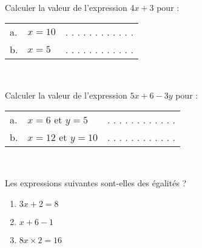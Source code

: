 \documentclass[a4paper,12pt,landscape,twocolumn]{article}
\begin{document}
{	\begin{exercice}\

		Calculer la valeur de l'expression $4x + 3$ pour : \vspace{0.3em}

		\begin{tabular}{lll}
			a. & $x = 10$ & . . . . . . . . . . . . \\ %
			b. & $x = 5$  & . . . . . . . . . . . . \\ %
		\end{tabular}
	\end{exercice}

	\begin{exercice}\

		Calculer la valeur de l'expression $5x + 6 - 3y$ pour : \vspace{0.3em}

		\begin{tabular}{lll}
			a. & $x = 6$ et $y = 5$   & . . . . . . . . . . . . \\ %
			b. & $x = 12$ et $y = 10$ & . . . . . . . . . . . . \\ %
		\end{tabular}
	\end{exercice}

	\begin{exercice}\

		Les expressions suivantes sont-elles des égalités ?
		\begin{enumerate}[label=\alph*.]
			\item $3x + 2 = 8$
			\item $x + 6 - 1$
			\item $8x × 2 = 16$
		\end{enumerate}
	\end{exercice}
}

\newpage

\setcounter{exercice}{0}
\end{document}
